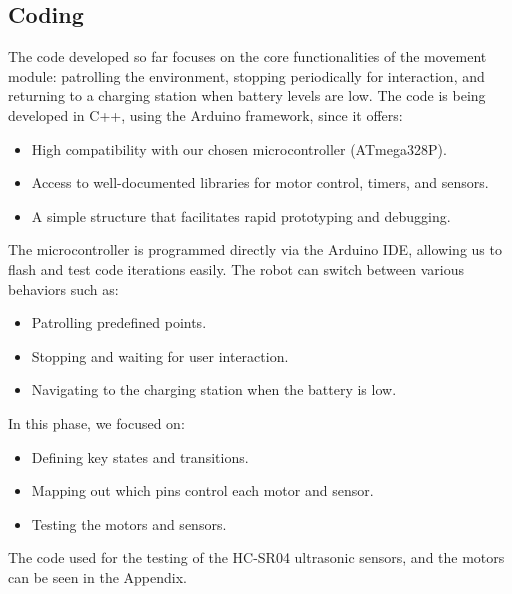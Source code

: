 \subsection{Coding}

The code developed so far focuses on the core functionalities of the movement module: patrolling the environment, stopping periodically for interaction, and returning to a charging station when battery levels are low. The code is being developed in C++, using the Arduino framework, since it offers:

\begin{itemize}
    \item High compatibility with our chosen microcontroller (ATmega328P).
    \item Access to well-documented libraries for motor control, timers, and sensors.
    \item A simple structure that facilitates rapid prototyping and debugging.
\end{itemize}

The microcontroller is programmed directly via the Arduino IDE, allowing us to flash and test code iterations easily. The robot can switch between various behaviors such as:

\begin{itemize}
    \item Patrolling predefined points.
    \item Stopping and waiting for user interaction.
    \item Navigating to the charging station when the battery is low.
\end{itemize}

In this phase, we focused on:

\begin{itemize}
    \item Defining key states and transitions.
    \item Mapping out which pins control each motor and sensor.
    \item Testing the motors and sensors.
\end{itemize}

The code used for the testing of the HC-SR04 ultrasonic sensors, and the motors can be seen in the Appendix.
